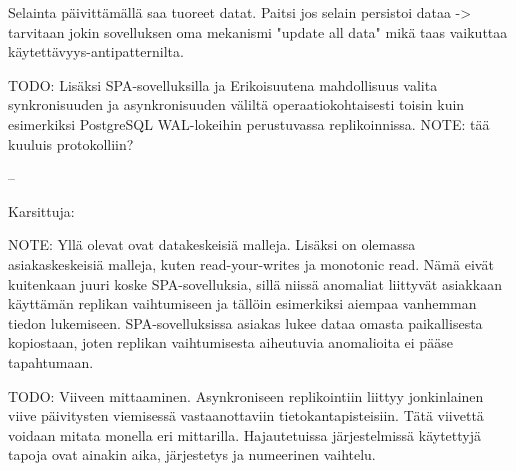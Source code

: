 \documentclass[finnish,twoside,censored,csm,sw-track-2018]{HYthesisML}
\begin{document}
Selainta päivittämällä saa tuoreet datat. Paitsi jos selain persistoi dataa -> tarvitaan jokin sovelluksen oma mekanismi "update all data" mikä taas vaikuttaa käytettävyys-antipatternilta.

TODO: Lisäksi SPA-sovelluksilla ja Erikoisuutena mahdollisuus valita synkronisuuden ja asynkronisuuden väliltä operaatiokohtaisesti toisin kuin esimerkiksi PostgreSQL WAL-lokeihin perustuvassa replikoinnissa. NOTE: tää kuuluis protokolliin?

--

Karsittuja:

NOTE: Yllä olevat ovat datakeskeisiä malleja. Lisäksi on olemassa asiakaskeskeisiä malleja, kuten read-your-writes ja monotonic read. Nämä eivät kuitenkaan juuri koske SPA-sovelluksia, sillä niissä anomaliat liittyvät asiakkaan käyttämän replikan vaihtumiseen ja tällöin esimerkiksi aiempaa vanhemman tiedon lukemiseen. SPA-sovelluksissa asiakas lukee dataa omasta paikallisesta kopiostaan, joten replikan vaihtumisesta aiheutuvia anomalioita ei pääse tapahtumaan.

TODO: Viiveen mittaaminen. Asynkroniseen replikointiin liittyy jonkinlainen viive päivitysten viemisessä vastaanottaviin tietokantapisteisiin. Tätä viivettä voidaan mitata monella eri mittarilla. Hajautetuissa järjestelmissä käytettyjä tapoja ovat ainakin aika, järjestetys ja numeerinen vaihtelu.
\end{document}
